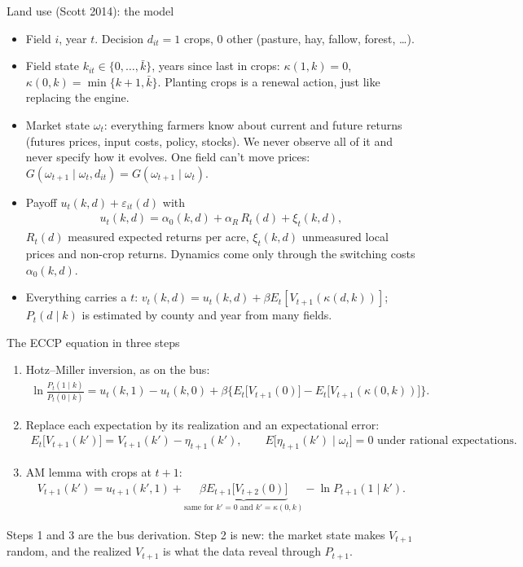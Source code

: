 \documentclass[aspectratio=169,11pt]{beamer}
\begin{document}
\begin{frame}{Land use (Scott 2014): the model}
\small
\begin{itemize}
\item Field $i$, year $t$. Decision $d_{it} = 1$ crops, $0$ other (pasture, hay, fallow, forest, \ldots).
\item Field state $k_{it} \in \{0, \ldots, \bar k\}$, years since last in crops: $\kappa(1,k) = 0$, $\kappa(0,k) = \min\{k+1, \bar k\}$. Planting crops is a \alert{renewal action}, just like replacing the engine.
\item Market state $\omega_t$: everything farmers know about current and future returns (futures prices, input costs, policy, stocks). We never observe all of it and never specify how it evolves. One field can't move prices: $G(\omega_{t+1} \mid \omega_t, d_{it}) = G(\omega_{t+1} \mid \omega_t)$.
\item Payoff $u_t(k,d) + \varepsilon_{it}(d)$ with
\begin{align*}
u_t(k,d) = \alpha_0(k,d) + \alpha_R\, R_t(d) + \xi_t(k,d),
\end{align*}
$R_t(d)$ measured expected returns per acre, $\xi_t(k,d)$ unmeasured local prices and non-crop returns. Dynamics come only through the switching costs $\alpha_0(k,d)$.
\item Everything carries a $t$: $v_t(k,d) = u_t(k,d) + \beta E_t[V_{t+1}(\kappa(d,k))]$; $P_t(d \mid k)$ is estimated by county and year from many fields.
\end{itemize}
\end{frame}

\begin{frame}{The ECCP equation in three steps}
\small
\begin{enumerate}
\item Hotz--Miller inversion, as on the bus:
\begin{align*}
\ln \frac{P_t(1 \mid k)}{P_t(0 \mid k)} = u_t(k,1) - u_t(k,0) + \beta \Big\{E_t\big[V_{t+1}(0)\big] - E_t\big[V_{t+1}(\kappa(0,k))\big]\Big\}.
\end{align*}
\item Replace each expectation by its realization and an \alert{expectational error}:
\begin{align*}
E_t\big[V_{t+1}(k')\big] = V_{t+1}(k') - \eta_{t+1}(k'), \qquad E\big[\eta_{t+1}(k') \mid \omega_t\big] = 0 \text{ under rational expectations.}
\end{align*}
\item AM lemma with crops at $t+1$:
\begin{align*}
V_{t+1}(k') = u_{t+1}(k',1) + \underbrace{\beta E_{t+1}\big[V_{t+2}(0)\big]}_{\text{same for } k' = 0 \text{ and } k' = \kappa(0,k)} - \ln P_{t+1}(1 \mid k').
\end{align*}
\end{enumerate}
Steps 1 and 3 are the bus derivation. Step 2 is new: the market state makes $V_{t+1}$ random, and the realized $V_{t+1}$ is what the data reveal through $P_{t+1}$.
\end{frame}
\end{document}
